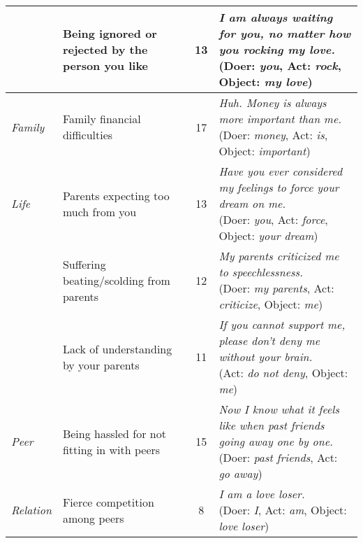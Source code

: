\begin{table*}
\begin{center}
\begin{footnotesize}
\begin{tabular}{llcl}
&	Being ignored or rejected by the person you like&	13	&
\tabincell{l}{\emph{I am always waiting for you, no matter how you rocking my love.}
\\(Doer: \emph{you}, Act: \emph{rock}, Object: \emph{my love})}\\  \hline
\emph{Family}&	Family financial difficulties	&	17	&
\tabincell{l}{\emph{Huh. Money is always more important than me.}
\\(Doer: \emph{money}, Act: \emph{is}, Object: \emph{important})}\\ \cline{2-4}
\emph{Life}&	Parents expecting too much from you	&	13	&
\tabincell{l}{\emph{Have you ever considered my feelings to force your dream on me.}
\\(Doer: \emph{you}, Act: \emph{force}, Object: \emph{your dream})}\\ \cline{2-4}
&	Suffering beating/scolding from parents	&	12	&
\tabincell{l}{\emph{My parents criticized me to speechlessness.}
\\(Doer: \emph{my parents}, Act: \emph{criticize}, Object: \emph{me})}\\ \cline{2-4}
&	Lack of understanding by your parents	&	11	&
\tabincell{l}{\emph{If you cannot support me, please don't deny me without your brain.}
\\(Act: \emph{do not deny}, Object: \emph{me})}\\ \hline
\emph{Peer}&	Being hassled for not fitting in with peers	&	15	&
\tabincell{l}{\emph{Now I know what it feels like when past friends going away one by one.}
\\(Doer: \emph{past friends}, Act: \emph{go away})}\\ \cline{2-4}
\emph{Relation}&	Fierce competition among peers	&	8	&
\tabincell{l}{\emph{I am a love loser.}
\\(Doer: \emph{I}, Act: \emph{am}, Object: \emph{love loser})}\\ \hline
\end{tabular}
\end{footnotesize}
\label{tab:typeOccurNum1}
\end{center}
\end{table*}

